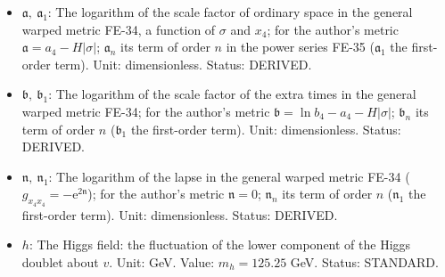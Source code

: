 \documentclass[
  10pt,
]{article}
\begin{document}
\begin{itemize}
  the author). Unit: dimensionless. Status: STANDARD.
\item
  \(\mathfrak{a},\ \mathfrak{a}_1\): The logarithm of the scale factor
  of ordinary space in the general warped metric FE-34, a function of
  \(\sigma\) and \(x_4\); for the author's metric
  \(\mathfrak{a} = a_4 - H\lvert\sigma\rvert\); \(\mathfrak{a}_n\) its
  term of order \(n\) in the power series FE-35 (\(\mathfrak{a}_1\) the
  first-order term). Unit: dimensionless. Status: DERIVED.
\item
  \(\mathfrak{b},\ \mathfrak{b}_1\): The logarithm of the scale factor
  of the extra times in the general warped metric FE-34; for the
  author's metric
  \(\mathfrak{b} = \ln b_4 - a_4 - H\lvert\sigma\rvert\);
  \(\mathfrak{b}_n\) its term of order \(n\) (\(\mathfrak{b}_1\) the
  first-order term). Unit: dimensionless. Status: DERIVED.
\item
  \(\mathfrak{n},\ \mathfrak{n}_1\): The logarithm of the lapse in the
  general warped metric FE-34
  (\(g_{x_4x_4} = -\mathrm{e}^{2\mathfrak{n}}\)); for the author's
  metric \(\mathfrak{n} = 0\); \(\mathfrak{n}_n\) its term of order
  \(n\) (\(\mathfrak{n}_1\) the first-order term). Unit: dimensionless.
  Status: DERIVED.
\item
  \(h\): The Higgs field: the fluctuation of the lower component of the
  Higgs doublet about \(v\). Unit: GeV. Value: \(m_h = 125.25\) GeV.
  Status: STANDARD.
\end{itemize}
\end{document}
